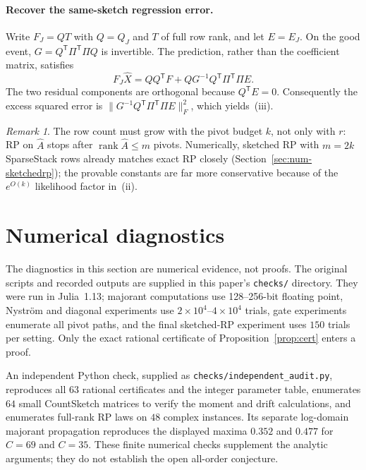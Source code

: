 \documentclass[11pt,a4paper]{article}
\theoremstyle{definition}
\theoremstyle{remark}
\newtheorem{remark}[theorem]{Remark}
\newcommand{\rank}{\operatorname{rank}}
\newcommand{\norm}[1]{\lVert#1\rVert}
\newcommand{\1}{\mathbf 1}
\newcommand{\T}{\mathsf T}
\begin{document}
\paragraph{Recover the same-sketch regression error.}
Write $F_J=QT$ with $Q=Q_J$ and $T$ of full row rank, and let
$E=E_J$. On the good event, $G=Q^\T\Pi^\T\Pi Q$ is invertible. The
prediction, rather than the coefficient matrix, satisfies
\[
 F_J\widehat X=QQ^\T F+QG^{-1}Q^\T\Pi^\T\Pi E.
\]
The two residual components are orthogonal because $Q^\T E=0$.
Consequently the excess squared error is
$\norm{G^{-1}Q^\T\Pi^\T\Pi E}_F^2$, which yields~(iii).

\begin{remark}
The row count must grow with the pivot budget $k$, not only with $r$:
RP on $\widehat A$ stops after $\rank\widehat A\le m$ pivots. Numerically, sketched RP
with $m=2k$ SparseStack rows already matches exact RP closely
(Section~\ref{sec:num-sketchedrp}); the provable constants are far more
conservative because of the $e^{O(k)}$ likelihood factor in~(ii).
\end{remark}

\section{Numerical diagnostics}\label{sec:numerics}

The diagnostics in this section are numerical evidence, not proofs.
The original scripts and recorded outputs are supplied in this paper's
\texttt{checks/} directory. They were run in Julia~1.13; majorant
computations use 128--256-bit floating point, Nystr\"om and diagonal
experiments use $2\times10^4$--$4\times10^4$ trials, gate experiments
enumerate all pivot paths, and the final sketched-RP experiment uses
$150$ trials per setting. Only the exact rational certificate of
Proposition~\ref{prop:cert} enters a proof.

An independent Python check, supplied as
\texttt{checks/independent\_audit.py}, reproduces all $63$ rational
certificates and the integer parameter table, enumerates $64$ small
CountSketch matrices to verify the moment and drift calculations, and
enumerates full-rank RP laws on $48$ complex instances. Its separate
log-domain majorant propagation reproduces the displayed maxima
$0.352$ and $0.477$ for $C=69$ and $C=35$. These finite numerical
checks supplement the analytic arguments; they do not establish the
open all-order conjecture.
\end{document}
